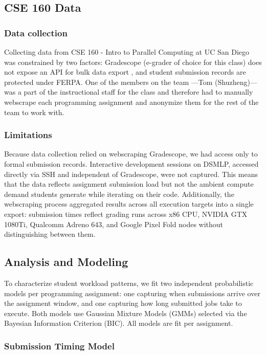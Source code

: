 \documentclass[acmlarge]{acmart}
\begin{document}
\subsection{CSE 160 Data}

\subsubsection{Data collection}
Collecting data from CSE 160 -  Intro to Parallel Computing at UC San Diego was constrained by two factors: Gradescope (e-grader of choice for this class) does not expose an API for bulk data export \cite{gradescope_guides}, and student submission records are protected under FERPA. One of the members on the team ---Tom (Shuzheng)--- was a part of the instructional staff for the class and therefore had to manually webscrape each programming assignment and anonymize them for the rest of the team to work with.

\subsubsection{Limitations}
Because data collection relied on webscraping Gradescope, we had access only to formal submission records. Interactive development sessions on DSMLP, accessed directly via SSH and independent of Gradescope, were not captured. This means that the data reflects assignment submission load but not the ambient compute demand students generate while iterating on their code. Additionally, the webscraping process aggregated results across all execution targets into a single export: submission times reflect grading runs across x86 CPU, NVIDIA GTX 1080Ti, Qualcomm Adreno 643, and Google Pixel Fold nodes without distinguishing between them.

\subsection{Analysis and Modeling}
\label{sec:gmm}
To characterize student workload patterns, we fit two independent
probabilistic models per programming assignment: one capturing when
submissions arrive over the assignment window, and one capturing how
long submitted jobs take to execute. Both models use Gaussian Mixture
Models (GMMs) selected via the Bayesian Information Criterion (BIC).
All models are fit per assignment.
\subsubsection{Submission Timing Model}
 
\end{document}
